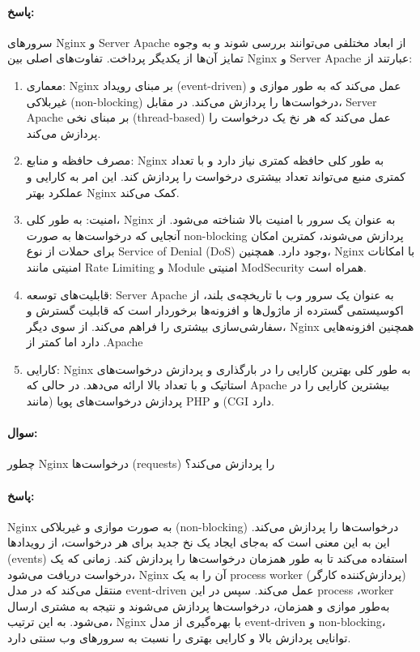 \documentclass[a4paper,10pt]{article}
\begin{document}
    \paragraph{پاسخ:} سرورهای Nginx و Server Apache از ابعاد مختلفی می‌توانند بررسی شوند و به وجوه تمایز آن‌ها از یکدیگر پرداخت. تفاوت‌های اصلی بین Nginx و Server Apache عبارتند از:


    \begin{enumerate}
        
        \item معماری: Nginx بر مبنای رویداد (event-driven) عمل می‌کند که به طور موازی و غیربلاکی (non-blocking) درخواست‌ها را پردازش می‌کند. در مقابل، Server Apache بر مبنای نخی (thread-based) عمل می‌کند که هر نخ یک درخواست را پردازش می‌کند.

        \item مصرف حافظه و منابع: Nginx به طور کلی حافظه کمتری نیاز دارد و با تعداد کمتری منبع می‌تواند تعداد بیشتری درخواست را پردازش کند. این امر به کارایی و عملکرد بهتر Nginx کمک می‌کند.

        \item امنیت: به طور کلی، Nginx به عنوان یک سرور با امنیت بالا شناخته می‌شود. از آنجایی که درخواست‌ها به صورت non-blocking پردازش می‌شوند، کمترین امکان برای حملات از نوع Service of Denial (DoS) وجود دارد. همچنین، Nginx با امکانات امنیتی مانند Rate Limiting و Module امنیتی ModSecurity همراه است.

        \item قابلیت‌های توسعه: Server Apache به عنوان یک سرور وب با تاریخچه‌ی بلند، از اکوسیستمی گسترده از ماژول‌ها و افزونه‌ها برخوردار است که قابلیت گسترش و سفارشی‌سازی بیشتری را فراهم می‌کند. از سوی دیگر، Nginx همچنین افزونه‌هایی دارد اما کمتر از .Apache

        \item کارایی: Nginx به طور کلی بهترین کارایی را در بارگذاری و پردازش درخواست‌های استاتیک و با تعداد بالا ارائه می‌دهد. در حالی که Apache بیشترین کارایی را در پردازش درخواست‌های پویا (مانند PHP و (CGI دارد.

    \end{enumerate}

    \newpage

    \paragraph{سوال:} چطور Nginx درخواست‌ها (requests) را پردازش می‌کند؟

    \paragraph{پاسخ:} Nginx به صورت موازی و غیربلاکی (non-blocking) درخواست‌ها را پردازش می‌کند. این به این معنی است که به‌جای ایجاد یک نخ جدید برای هر درخواست، از رویدادها (events) استفاده می‌کند تا به طور همزمان درخواست‌ها را پردازش کند. زمانی که یک درخواست دریافت می‌شود، Nginx آن را به یک process worker (پردازش‌کننده کارگر) منتقل می‌کند که در مدل event-driven عمل می‌کند. سپس در این process ،worker به‌طور موازی و همزمان، درخواست‌ها پردازش می‌شوند و نتیجه به مشتری ارسال می‌شود. به این ترتیب، Nginx با بهره‌گیری از مدل event-driven و non-blocking، توانایی پردازش بالا و کارایی بهتری را نسبت به سرورهای وب سنتی دارد.
\end{document}

